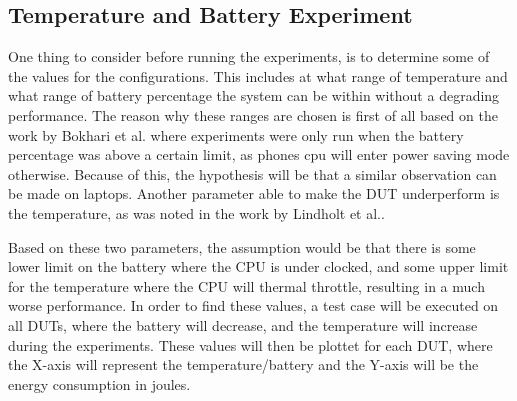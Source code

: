 \subsection{Temperature and Battery Experiment}

One thing to consider before running the experiments, is to determine some of the values for the configurations. This includes at what range of temperature and what range of battery percentage the system can be within without a degrading performance. The reason why these ranges are chosen is first of all based on the work by Bokhari et al.\cite*[]{Bokhari2020r3} where experiments were only run when the battery percentage was above a certain limit, as phones cpu will enter power saving mode otherwise. Because of this, the hypothesis will be that a similar observation can be made on laptops. Another parameter able to make the DUT underperform is the temperature, as was noted in the work by Lindholt et al.\cite*[]{Lindholt2022}. 

Based on these two parameters, the assumption would be that there is some lower limit on the battery where the CPU is under clocked, and some upper limit for the temperature where the CPU will thermal throttle, resulting in a much worse performance. In order to find these values, a test case will be executed on all DUTs, where the battery will decrease, and the temperature will increase during the experiments. These values will then be plottet for each DUT, where the X-axis will represent the temperature/battery and the Y-axis will be the energy consumption in joules.